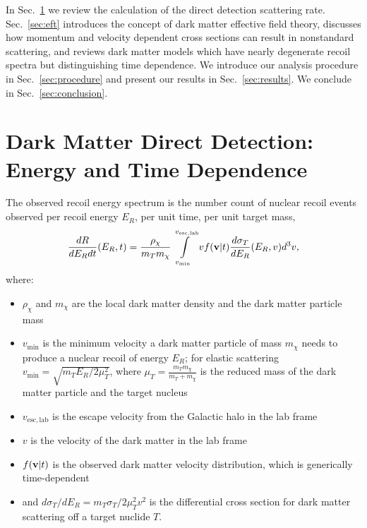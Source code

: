 \documentclass[11pt]{article}
\newcommand{\Sec}[1]{Sec.~\ref{#1}} \newcommand{\Secs}[2]{Secs.~\ref{#1} and \ref{#2}} \newcommand{\Secm}[2]{Secs.~\ref{#1} through \ref{#2}}
\begin{document}
In \Sec{sec:dd} we review the calculation of the direct detection scattering rate. \Sec{sec:eft} introduces the concept of dark matter effective field theory, discusses how momentum and velocity dependent cross sections can result in nonstandard scattering, and reviews dark matter models which have nearly degenerate recoil spectra but distinguishing time dependence. We introduce our analysis procedure in \Sec{sec:procedure} and present our results in \Sec{sec:results}. We conclude in \Sec{sec:conclusion}.


  

\section{Dark Matter Direct Detection: Energy and Time Dependence}\label{sec:dd}

The observed recoil energy spectrum is the number count of nuclear recoil events observed per recoil energy $E_R$, per unit time, per unit target mass,
\begin{equation}
\frac{dR}{dE_R dt}(E_R,t) =  \frac{\rho_\chi}{m_T m_\chi} \int\limits_{v_{\mathrm{min}}}^{v_{\mathrm{esc, lab}}}  v f(\mathrm{\mbox{\bf{v}}}|t) \frac{d\sigma_T}{dE_R} (E_R,v) d^3v ,
\label{eq:dRdEr_general}
\end{equation}
where:
\begin{itemize}
\item $\rho_\chi$ and $m_\chi$ are the local dark matter density and the dark matter particle mass
\item $v_\mathrm{min}$ is the minimum velocity a dark matter particle of mass $m_\chi$ needs to produce a nuclear recoil of energy $E_R$; for elastic scattering $v_\mathrm{min} = \sqrt{m_T E_R/2\mu_T^2}$, where $\mu_T=\frac{m_Tm_\chi}{m_T+m_\chi}$ is the reduced mass of the dark matter particle and the target nucleus
\item $v_{\mathrm{esc, lab}}$ is the escape velocity from the Galactic halo in the lab frame
\item $v$ is the velocity of the dark matter in the lab frame
\item $f(\mathrm{\mbox{\bf{v}}}|t)$ is the observed dark matter velocity distribution, which is generically time-dependent
\item and $d\sigma_T/dE_R=m_T \sigma_T /2\mu_T^2 v^2$ is the differential cross section for dark matter scattering off a target nuclide $T$.
\end{itemize}
\end{document}
